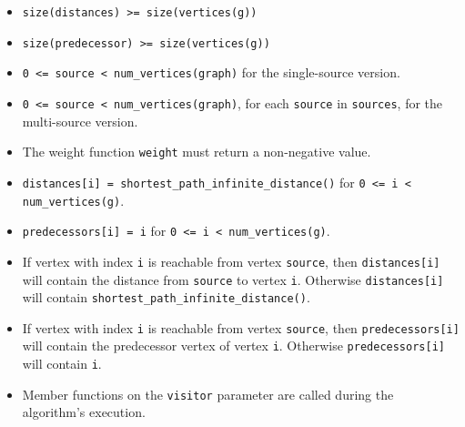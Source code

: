 \begin{itemdescr}
      \pnum\hardprecond
            \begin{itemize}
                  \item \lstinline{size(distances) >= size(vertices(g))}
                  \item \lstinline{size(predecessor) >= size(vertices(g))}
                  \item
                        \lstinline{0 <= source < num_vertices(graph)} for the single-source version.
                  \item
                        \lstinline{0 <= source < num_vertices(graph)}, for each \lstinline{source} in \lstinline{sources}, 
                                   for the multi-source version.
            \end{itemize}
      \pnum\preconditions
            \begin{itemize}
                  \item
                        The weight function \lstinline{weight} must return a non-negative value.
                  \item
                        \lstinline{distances[i] = shortest_path_infinite_distance()} for \lstinline{0 <= i < num_vertices(g)}.
                  \item
                        \lstinline{predecessors[i] = i} for \lstinline{0 <= i < num_vertices(g)}.
            \end{itemize}
      \pnum\effects
            \begin{itemize}
                  \item
                        If vertex with index \lstinline{i} is reachable from vertex \lstinline{source}, then
                        \lstinline{distances[i]} will contain the distance from \lstinline{source} to vertex
                        \lstinline{i}.  Otherwise \lstinline{distances[i]} will contain
                        \lstinline{shortest_path_infinite_distance()}.
                  \item
                        If vertex with index \lstinline{i} is reachable
                        from vertex \lstinline{source}, then \lstinline{predecessors[i]} will contain the
                        predecessor vertex of vertex \lstinline{i}. Otherwise \lstinline{predecessors[i]} will contain
                        \lstinline{i}.
                  \item Member functions on the \lstinline{visitor} parameter are called during the algorithm's execution.

\end{itemize}
\end{itemdescr}
